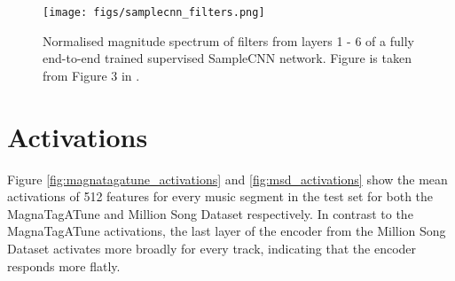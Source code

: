 \begin{figure}
    \hfill
    \hfill
    \caption{}
    \label{fig:filter_visualisation_billboard}
\end{figure}

\begin{figure}
    \centering
    \texttt{[image: figs/samplecnn\_filters.png]}
    \caption{Normalised magnitude spectrum of filters from layers 1 - 6 of a fully end-to-end trained supervised SampleCNN network. Figure is taken from Figure 3 in \cite{lee2018samplecnn}.}
    \label{fig:samplecnn_filters}
\end{figure}


\section{Activations}
Figure \ref{fig:magnatagatune_activations} and \ref{fig:msd_activations} show the mean activations of 512 features for every music segment in the test set for both the MagnaTagATune and Million Song Dataset respectively. In contrast to the MagnaTagATune activations, the last layer of the encoder from the Million Song Dataset activates more broadly for every track, indicating that the encoder responds more flatly.

